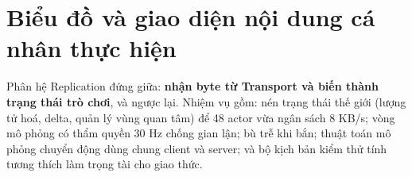 
\section{Biểu đồ và giao diện nội dung cá nhân thực hiện}
Phân hệ Replication đứng giữa: \textbf{nhận byte từ Transport và biến thành trạng thái trò chơi}, và ngược lại. Nhiệm vụ gồm: nén trạng thái thế giới (lượng tử hoá, delta, quản lý vùng quan tâm) để 48 actor vừa ngân sách 8 KB/s; vòng mô phỏng có thẩm quyền 30 Hz chống gian lận; bù trễ khi bắn; thuật toán mô phỏng chuyển động dùng chung client và server; và bộ kịch bản kiểm thử tính tương thích làm trọng tài cho giao thức.

